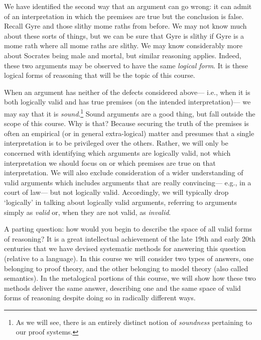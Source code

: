 We have identified the second way that an argument can go wrong: it can admit of an interpretation in which the premises are true but the conclusion is false.
Recall Gyre and those slithy mome raths from before.
We may not know much about these sorts of things, but we can be sure that Gyre is slithy if Gyre is a mome rath where all mome raths are slithy.
We may know considerably more about Socrates being male and mortal, but similar reasoning applies.
Indeed, these two arguments may be observed to have the same \textit{logical form}.
It is these logical forms of reasoning that will be the topic of this course.

When an argument has neither of the defects considered above--- i.e., when it is both logically valid and has true premises (on the intended interpretation)--- we may say that it is \textit{sound}.\footnote{As we will see, there is an entirely distinct notion of \textit{soundness} pertaining to our proof systems.}
Sound arguments are a good thing, but fall outside the scope of this course.
Why is that?
Because securing the truth of the premises is often an empirical (or in general extra-logical) matter and presumes that a single interpretation is to be privileged over the others.
Rather, we will only be concerned with identifying which arguments are logically valid, not which interpretation we should focus on or which premises are true on that interpretation.
We will also exclude consideration of a wider understanding of valid arguments which includes arguments that are really convincing--- e.g., in a court of law--- but not logically valid.
Accordingly, we will typically drop `logically' in talking about logically valid arguments, referring to arguments simply as \textit{valid} or, when they are not valid, as \textit{invalid}.

A parting question: how would you begin to describe the space of all valid forms of reasoning? 
It is a great intellectual achievement of the late 19th and early 20th centuries that we have devised systematic methods for answering this question (relative to a language).
In this course we will consider two types of answers, one belonging to proof theory, and the other belonging to model theory (also called semantics).
In the metalogical portions of this course, we will show how these two methods deliver the same answer, describing one and the same space of valid forms of reasoning despite doing so in radically different ways.





